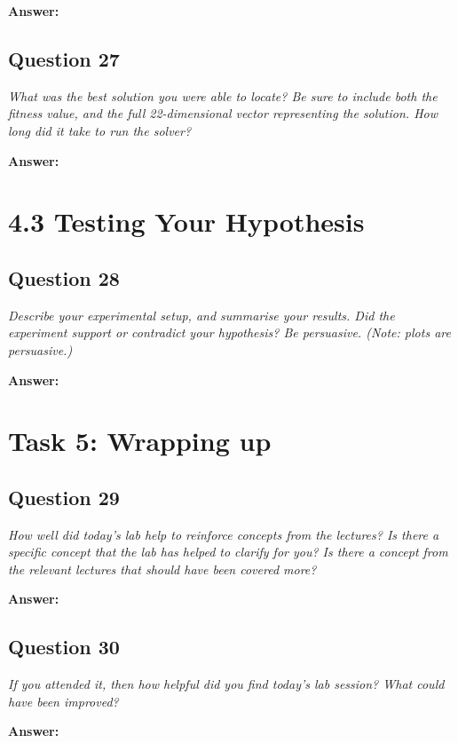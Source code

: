 \documentclass[a4paper]{article}
\begin{document}
\textbf{Answer:}

\subsection*{Question 27}
\emph{What was the best solution you were able to locate? Be sure to
include both the fitness value, and the full 22-dimensional vector representing the solution. How long did it take to run the solver?}

\textbf{Answer:}

\section*{4.3 Testing Your Hypothesis}

\subsection*{Question 28}
\emph{Describe your experimental setup, and summarise your results.
Did the experiment support or contradict your hypothesis? Be persuasive. (Note: plots are persuasive.)}

\textbf{Answer:}

\section*{Task 5: Wrapping up}

\subsection*{Question 29}
\emph{How well did today's lab help to reinforce concepts from the
lectures? Is there a specific concept that the lab has helped to clarify for you? Is there a concept from the relevant lectures that should have been covered more?}

\textbf{Answer:}

\subsection*{Question 30}
\emph{If you attended it, then how helpful did you find today's lab
session? What could have been improved?}

\textbf{Answer:}
\end{document}
